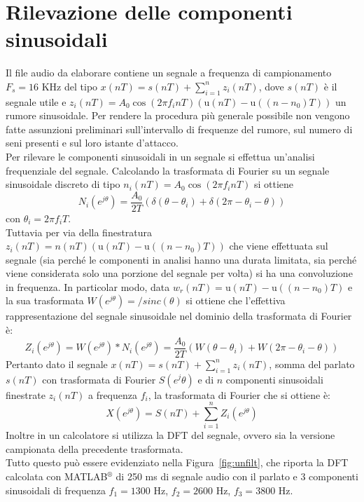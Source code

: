 \documentclass[10pt,A4]{article}
\begin{document}
\section{Rilevazione delle componenti sinusoidali}
Il file audio da elaborare contiene un segnale a frequenza di campionamento $F_s = 16$ KHz del tipo $x(nT) = s(nT) + \sum_{i=1}^{n} z_i(nT)$, dove $s(nT)$ è il segnale utile e $z_i(nT) = A_0 \cos(2 \pi f_i n T)(\mathrm{u}(nT) - \mathrm{u}((n - n_0)T))$ un rumore sinusoidale. Per rendere la procedura più generale possibile non vengono fatte assunzioni preliminari sull'intervallo di frequenze del rumore, sul numero di seni presenti e sul loro istante d'attacco. \\
Per rilevare le componenti sinusoidali in un segnale si effettua un'analisi frequenziale del segnale.
Calcolando la trasformata di Fourier su un segnale sinusoidale discreto di tipo $n_i(nT) = A_0 \cos(2 \pi f_i n T)$ si ottiene
\begin{equation}
  N_i(e^{j\theta}) = \frac{A_0}{2T}(\delta(\theta - \theta_i) + \delta(2 \pi - \theta_i - \theta))
\end{equation}
con $\theta_i = 2\pi f_i T$. \\
Tuttavia per via della finestratura $z_i(nT) = n(nT)(\mathrm{u}(nT) - \mathrm{u}((n - n_0)T))$ che viene effettuata sul segnale (sia perché le componenti in analisi hanno una durata limitata, sia perché viene considerata solo una porzione del segnale per volta) si ha una convoluzione in frequenza. In particolar modo, data $w_r(nT) =  \mathrm{u}(nT) - \mathrm{u}((n - n_0)T)$ e la sua trasformata $W(e^{j\theta}) = /sinc(\theta) $ si ottiene che l'effettiva rappresentazione del segnale sinusoidale nel dominio della trasformata di Fourier è:
\begin{equation}
  Z_i(e^{j\theta}) = W(e^{j\theta}) * N_i(e^{j\theta}) = \frac{A_0}{2T}(W(\theta - \theta_i) + W(2 \pi - \theta_i - \theta))
\end{equation}
Pertanto dato il segnale $x(nT) = s(nT) + \sum_{i=1}^{n} z_i(nT)$, somma del parlato $s(nT)$ con trasformata di Fourier $S(e^j\theta)$ e di $n$ componenti sinusoidali finestrate $z_i(nT)$ a frequenza $f_i$, la trasformata di Fourier che si ottiene è:
\begin{equation}
  X(e^{j\theta}) = S(nT) + \sum_{i=1}^{n} Z_i(e^{j\theta})
\end{equation}
Inoltre in un calcolatore si utilizza la DFT del segnale, ovvero sia la versione campionata della precedente trasformata. \\
Tutto questo può essere evidenziato nella Figura~\ref{fig:unfilt}, che riporta la DFT calcolata con MATLAB$^{\circledR}$ di 250 ms di segnale audio con il parlato e 3 componenti sinusoidali di frequenza $f_1 = 1300$ Hz, $f_2 = 2600$ Hz, $f_3 = 3800$ Hz. \\
\end{document}
